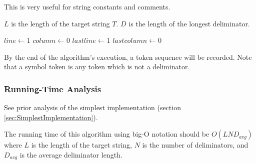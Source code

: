\documentclass[10pt,a4paper]{article}
\begin{document}
This is very useful for string constants and comments.

$L$ is the length of the target string $T$. $D$ is the length of the longest deliminator.

\begin{algorithm}[H]
\caption{$tokenize(T)$}

$line\gets 1$\;
$column\gets 0$\;
$lastline\gets 1$\;
$lastcolumn\gets 0$\;

\end{algorithm}

By the end of the algorithm's execution, a token sequence will be recorded. Note that a symbol token is any token which is not a deliminator.

\subsubsection{Running-Time Analysis}
See prior analysis of the simplest implementation (section \ref{sec:SimplestImplementation}).

The running time of this algorithm using big-O notation should be $O(LND_{avg})$ where $L$ is the length of the target string, $N$ is the number of deliminators, and $D_{avg}$ is the average deliminator length.
\end{document}
